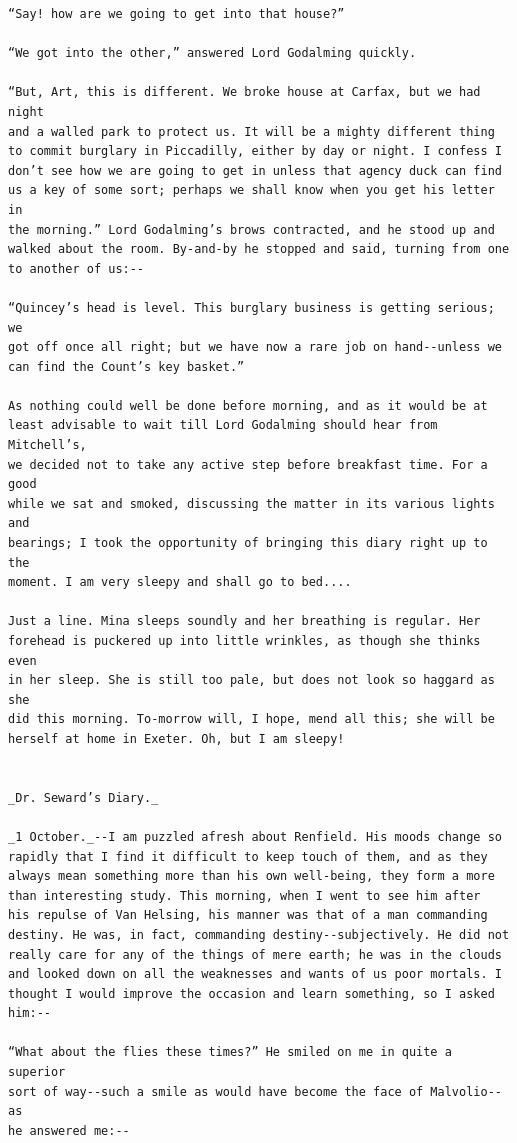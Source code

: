\documentclass{article}
\begin{document}
\begin{verbatim}
“Say! how are we going to get into that house?”

“We got into the other,” answered Lord Godalming quickly.

“But, Art, this is different. We broke house at Carfax, but we had night
and a walled park to protect us. It will be a mighty different thing
to commit burglary in Piccadilly, either by day or night. I confess I
don’t see how we are going to get in unless that agency duck can find
us a key of some sort; perhaps we shall know when you get his letter in
the morning.” Lord Godalming’s brows contracted, and he stood up and
walked about the room. By-and-by he stopped and said, turning from one
to another of us:--

“Quincey’s head is level. This burglary business is getting serious; we
got off once all right; but we have now a rare job on hand--unless we
can find the Count’s key basket.”

As nothing could well be done before morning, and as it would be at
least advisable to wait till Lord Godalming should hear from Mitchell’s,
we decided not to take any active step before breakfast time. For a good
while we sat and smoked, discussing the matter in its various lights and
bearings; I took the opportunity of bringing this diary right up to the
moment. I am very sleepy and shall go to bed....

Just a line. Mina sleeps soundly and her breathing is regular. Her
forehead is puckered up into little wrinkles, as though she thinks even
in her sleep. She is still too pale, but does not look so haggard as she
did this morning. To-morrow will, I hope, mend all this; she will be
herself at home in Exeter. Oh, but I am sleepy!


_Dr. Seward’s Diary._

_1 October._--I am puzzled afresh about Renfield. His moods change so
rapidly that I find it difficult to keep touch of them, and as they
always mean something more than his own well-being, they form a more
than interesting study. This morning, when I went to see him after
his repulse of Van Helsing, his manner was that of a man commanding
destiny. He was, in fact, commanding destiny--subjectively. He did not
really care for any of the things of mere earth; he was in the clouds
and looked down on all the weaknesses and wants of us poor mortals. I
thought I would improve the occasion and learn something, so I asked
him:--

“What about the flies these times?” He smiled on me in quite a superior
sort of way--such a smile as would have become the face of Malvolio--as
he answered me:--


\end{verbatim}
\end{document}
